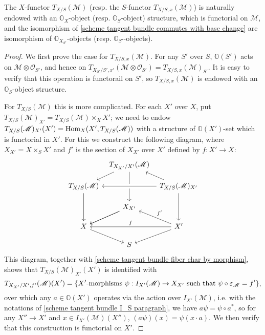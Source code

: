 \begin{corollary}\label{scheme tangent bundle commutes with base change module isomorphism}
The $X$-functor $T_{X/S}(\mathscr{M})$ (resp. the $S$-functor $T_{X/S,x}(\mathscr{M})$) is naturally endowed with an $\mathbb{O}_X$-object (resp. $\mathbb{O}_S$-object) structure, which is functorial on $\mathscr{M}$, and the isomorphism of \cref{scheme tangent bundle commutes with base change} are isomorphism of $\mathbb{O}_{X_{S'}}$-objects (resp. $\mathbb{O}_{S'}$-objects).
\end{corollary}
\begin{proof}
We first prove the case for $T_{X/S,x}(\mathscr{M})$. For any $S'$ over $S$, $\mathbb{O}(S')$ acts on $\mathscr{M}\otimes\mathscr{O}_{S'}$, and hence on $T_{X_{S'}/S',x'}(\mathscr{M}\otimes\mathscr{O}_{S'})=T_{X/S,x}(\mathscr{M})_{S'}$. It is easy to verify that this operation is functorail on $S'$, so $T_{X/S,x}(\mathscr{M})$ is endowed with an $\mathbb{O}_S$-object structure.\par
For $T_{X/S}(\mathscr{M})$ this is more complicated. For each $X'$ over $X$, put $T_{X/S}(\mathscr{M})_{X'}=T_{X/S}(\mathscr{M})\times_XX'$; we need to endow $T_{X/S}(\mathscr{M})_{X'}(X')=\mathrm{Hom}_X(X',T_{X/S}(\mathscr{M}))$ with a structure of $\mathbb{O}(X')$-set which is functorial in $X'$. For this we construct the following diagram, where $X_{X'}=X\times_SX'$ and $f'$ is the section of $X_{X'}$ over $X'$ defined by $f:X'\to X$:
\[\begin{tikzcd}[row sep=4mm,column sep=2mm]
&T_{X_{X'}/X'}(\mathscr{M})\ar[ld]\ar[dd]&\\
T_{X/S}(\mathscr{M})\ar[dd]&&T_{X/S}(\mathscr{M})_{X'}\ar[lu]\ar[dd]\ar[ll,crossing over]\\
&X_{X'}\ar[ld]\ar[ld]&\\
X\ar[rd]&&X'\ar[ll,swap,"f"]\ar[ld]\ar[lu,swap,"f'"]\\
&S&
\end{tikzcd}\]
This diagram, together with \cref{scheme tangent bundle fiber char by morphism}, shows that $T_{X/S}(\mathscr{M})_{X'}(X')$ is identified with
\begin{equation}\label{scheme tangent bundle commutes with base change module isomorphism-1}
T_{X_{X'}/X',f'}(\mathscr{M})(X')=\{\text{$X'$-morphisms $\psi:I_{X'}(\mathscr{M})\to X_{X'}$ such that $\psi\circ\varepsilon_{\mathscr{M}}=f'$}\},
\end{equation}
over which any $a\in\mathbb{O}(X')$ operates via the action over $I_{X'}(\mathscr{M})$, i.e. with the notations of \ref{scheme tangent bundle I_S paragraph}, we have $a\psi=\psi\circ a^*$, so for any $X''\to X'$ and $x\in I_{X'}(\mathscr{M})(X'')$, $(a\psi)(x)=\psi(x\cdot a)$. We then verify that this construction is functorial on $X'$.
\end{proof}

